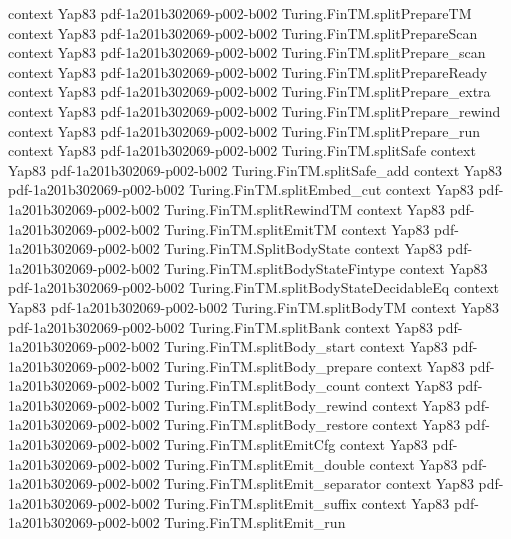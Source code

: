 \begin{theorem}
  {context}
  {Yap83}
  {pdf-1a201b302069-p002-b002}
\proofstep
  {Turing.FinTM.splitPrepareTM}
  {context}
  {Yap83}
  {pdf-1a201b302069-p002-b002}
\proofstep
  {Turing.FinTM.splitPrepareScan}
  {context}
  {Yap83}
  {pdf-1a201b302069-p002-b002}
\proofstep
  {Turing.FinTM.splitPrepare_scan}
  {context}
  {Yap83}
  {pdf-1a201b302069-p002-b002}
\proofstep
  {Turing.FinTM.splitPrepareReady}
  {context}
  {Yap83}
  {pdf-1a201b302069-p002-b002}
\proofstep
  {Turing.FinTM.splitPrepare_extra}
  {context}
  {Yap83}
  {pdf-1a201b302069-p002-b002}
\proofstep
  {Turing.FinTM.splitPrepare_rewind}
  {context}
  {Yap83}
  {pdf-1a201b302069-p002-b002}
\proofstep
  {Turing.FinTM.splitPrepare_run}
  {context}
  {Yap83}
  {pdf-1a201b302069-p002-b002}
\proofstep
  {Turing.FinTM.splitSafe}
  {context}
  {Yap83}
  {pdf-1a201b302069-p002-b002}
\proofstep
  {Turing.FinTM.splitSafe_add}
  {context}
  {Yap83}
  {pdf-1a201b302069-p002-b002}
\proofstep
  {Turing.FinTM.splitEmbed_cut}
  {context}
  {Yap83}
  {pdf-1a201b302069-p002-b002}
\proofstep
  {Turing.FinTM.splitRewindTM}
  {context}
  {Yap83}
  {pdf-1a201b302069-p002-b002}
\proofstep
  {Turing.FinTM.splitEmitTM}
  {context}
  {Yap83}
  {pdf-1a201b302069-p002-b002}
\proofstep
  {Turing.FinTM.SplitBodyState}
  {context}
  {Yap83}
  {pdf-1a201b302069-p002-b002}
\proofstep
  {Turing.FinTM.splitBodyStateFintype}
  {context}
  {Yap83}
  {pdf-1a201b302069-p002-b002}
\proofstep
  {Turing.FinTM.splitBodyStateDecidableEq}
  {context}
  {Yap83}
  {pdf-1a201b302069-p002-b002}
\proofstep
  {Turing.FinTM.splitBodyTM}
  {context}
  {Yap83}
  {pdf-1a201b302069-p002-b002}
\proofstep
  {Turing.FinTM.splitBank}
  {context}
  {Yap83}
  {pdf-1a201b302069-p002-b002}
\proofstep
  {Turing.FinTM.splitBody_start}
  {context}
  {Yap83}
  {pdf-1a201b302069-p002-b002}
\proofstep
  {Turing.FinTM.splitBody_prepare}
  {context}
  {Yap83}
  {pdf-1a201b302069-p002-b002}
\proofstep
  {Turing.FinTM.splitBody_count}
  {context}
  {Yap83}
  {pdf-1a201b302069-p002-b002}
\proofstep
  {Turing.FinTM.splitBody_rewind}
  {context}
  {Yap83}
  {pdf-1a201b302069-p002-b002}
\proofstep
  {Turing.FinTM.splitBody_restore}
  {context}
  {Yap83}
  {pdf-1a201b302069-p002-b002}
\proofstep
  {Turing.FinTM.splitEmitCfg}
  {context}
  {Yap83}
  {pdf-1a201b302069-p002-b002}
\proofstep
  {Turing.FinTM.splitEmit_double}
  {context}
  {Yap83}
  {pdf-1a201b302069-p002-b002}
\proofstep
  {Turing.FinTM.splitEmit_separator}
  {context}
  {Yap83}
  {pdf-1a201b302069-p002-b002}
\proofstep
  {Turing.FinTM.splitEmit_suffix}
  {context}
  {Yap83}
  {pdf-1a201b302069-p002-b002}
\proofstep
  {Turing.FinTM.splitEmit_run}

\end{theorem}
